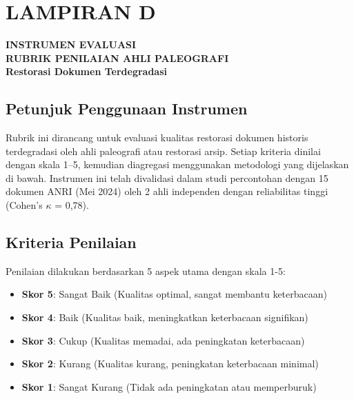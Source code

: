 
\section*{LAMPIRAN D}

\vspace{1em}

\begin{center}
{\Large\textbf{INSTRUMEN EVALUASI}}\\[0.5em]
{\Large\textbf{RUBRIK PENILAIAN AHLI PALEOGRAFI}}\\[0.5em]
{\large\textbf{Restorasi Dokumen Terdegradasi}}
\end{center}

\vspace{2em}


\subsection*{Petunjuk Penggunaan Instrumen}

Rubrik ini dirancang untuk evaluasi kualitas restorasi dokumen historis terdegradasi oleh ahli paleografi atau restorasi arsip. Setiap kriteria dinilai dengan skala 1--5, kemudian diagregasi menggunakan metodologi yang dijelaskan di bawah. Instrumen ini telah divalidasi dalam studi percontohan dengan 15 dokumen ANRI (Mei 2024) oleh 2 ahli independen dengan reliabilitas tinggi (Cohen's $\kappa$ = 0,78).

\vspace{2em}


\subsection*{Kriteria Penilaian}

Penilaian dilakukan berdasarkan 5 aspek utama dengan skala 1-5:
\begin{itemize}[leftmargin=*, itemsep=0pt]
    \item \textbf{Skor 5}: Sangat Baik (Kualitas optimal, sangat membantu keterbacaan)
    \item \textbf{Skor 4}: Baik (Kualitas baik, meningkatkan keterbacaan signifikan)
    \item \textbf{Skor 3}: Cukup (Kualitas memadai, ada peningkatan keterbacaan)
    \item \textbf{Skor 2}: Kurang (Kualitas kurang, peningkatan keterbacaan minimal)
    \item \textbf{Skor 1}: Sangat Kurang (Tidak ada peningkatan atau memperburuk)
\end{itemize}

